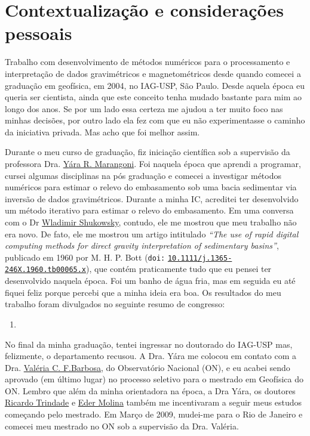\section{Contextualização e considerações pessoais}
\label{sec:apresentacao-consideracoes}

Trabalho com desenvolvimento de métodos numéricos para o processamento e
interpretação de dados gravimétricos e magnetométricos desde quando comecei
a graduação em geofísica, em 2004, no IAG-USP, São Paulo.
Desde aquela época eu queria ser cientista, ainda que este conceito tenha mudado 
bastante para mim ao longo dos anos. Se por um lado essa certeza me ajudou a 
ter muito foco nas minhas decisões, por outro lado ela fez com que eu não experimentasse
o caminho da iniciativa privada. Mas acho que foi melhor assim.

Durante o meu curso de graduação, fiz iniciação
científica sob a supervisão da professora Dra. \href{https://lattes.cnpq.br/5050611044655332}{Y{\'a}ra R. Marangoni}. 
Foi naquela época que aprendi a programar, cursei algumas disciplinas na pós graduação e 
comecei a investigar métodos numéricos para estimar o relevo do embasamento sob uma bacia
sedimentar via inversão de dados gravimétricos. 
Durante a minha IC, acreditei ter desenvolvido um método iterativo para estimar o relevo do
embasamento. 
Em uma conversa com o Dr \href{https://lattes.cnpq.br/6171841822916587}{Wladimir Shukowsky}, contudo, ele me mostrou que meu trabalho não
era novo.
De fato, ele me mostrou um artigo intitulado 
\textit{``The use of rapid digital computing methods for direct gravity interpretation of sedimentary basins''}, publicado em 1960 por M. H. P. Bott (\texttt{doi:} \href{https://doi.org/10.1111/j.1365-246X.1960.tb00065.x}{\texttt{10.1111/j.1365-246X.1960.tb00065.x}}), que contém praticamente tudo que eu pensei ter desenvolvido naquela época.
Foi um banho de água fria, mas em seguida eu até fiquei feliz porque percebi que a minha
ideia era boa. Os resultados do meu trabalho foram divulgados no seguinte resumo de 
congresso:
\begin{enumerate}
	\item {}
\end{enumerate}

No final da minha graduação, tentei ingressar no doutorado do IAG-USP mas, felizmente,
o departamento recusou. A Dra. Y{\'a}ra me colocou em contato com a Dra. \href{https://lattes.cnpq.br/0391036221142471}{Valéria C. F.Barbosa}, do Observatório Nacional (ON), e eu acabei sendo aprovado (em último lugar)
no processo seletivo para o mestrado em Geofísica do ON. Lembro que além da minha
orientadora na época, a Dra Yára, os doutores \href{https://lattes.cnpq.br/3934334115083849}{Ricardo Trindade} e \href{https://lattes.cnpq.br/0921576804781499}{Eder Molina} também 
me incentivaram a seguir meus estudos começando pelo mestrado.
Em Março de 2009, mudei-me para o Rio de Janeiro e comecei meu mestrado no ON sob a
supervisão da Dra. Valéria.

